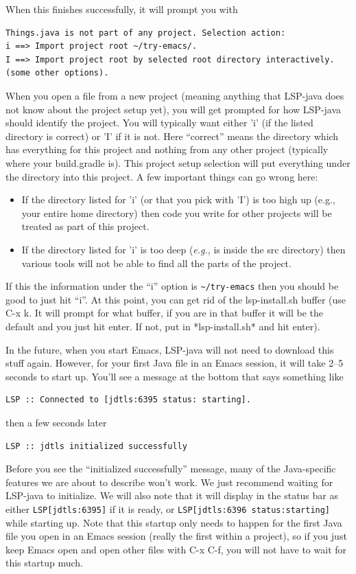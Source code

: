 \documentclass[12pt]{article}
\begin{document}
When this finishes successfully, it will prompt you with
\begin{verbatim}
Things.java is not part of any project. Selection action:
i ==> Import project root ~/try-emacs/.
I ==> Import project root by selected root directory interactively.
(some other options).
\end{verbatim}
When you open a file from a new project (meaning anything that
LSP-java does not know about the project setup yet), you will get
prompted for how LSP-java should identify the project.  You will
typically want either 'i' (if the listed directory is correct) or 'I'
if it is not.  Here ``correct'' means the directory which has
everything for this project and nothing from any other project
(typically where your build.gradle is).  This project setup selection
will put everything under the directory into this project.  A few
important things can go wrong here:
\begin{itemize}
\item If the directory listed for 'i' (or that you pick with 'I') is
  too high up (e.g., your entire home directory) then code you write
  for other projects will be treated as part of this project.
\item If the directory listed for 'i' is too deep (\emph{e.g.}, is inside
  the src directory) then various tools will not be able to find all the
  parts of the project.
\end{itemize}
If this the information under the ``i'' option is \verb+~/try-emacs+ then
you should be good to just hit ``i''.  At this point, you can get rid
of the lsp-install.sh buffer (use C-x k.  It will prompt for what buffer,
if you are in that buffer it will be the default and you just hit enter.
If not, put in *lsp-install.sh* and hit enter).


In the future, when you start Emacs, LSP-java will not need to
download this stuff again.  However, for your first Java file in an
Emacs session, it will take 2--5 seconds to start up.  You'll see a
message at the bottom that says something like
\begin{verbatim}
LSP :: Connected to [jdtls:6395 status: starting].
\end{verbatim}
then a few seconds later

\begin{verbatim}
LSP :: jdtls initialized successfully
\end{verbatim}

Before you see the ``initialized successfully'' message, many of the
Java-specific features we are about to describe won't work.  We just
recommend waiting for LSP-java to initialize.  We will also note that
it will display in the status bar as either \verb+LSP[jdtls:6395]+ if
it is ready, or \verb+LSP[jdtls:6396 status:starting]+ while starting
up.  Note that this startup only needs to happen for the first
Java file you open in an Emacs session (really the first within a project), so
if you just keep Emacs open and open other files with C-x C-f, you will not
have to wait for this startup much.
\end{document}
